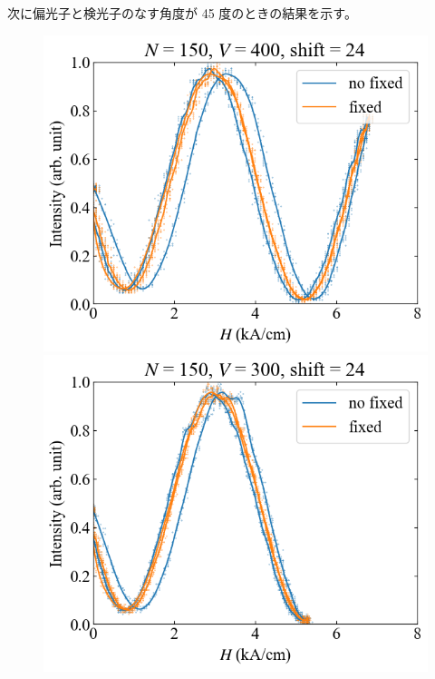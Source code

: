 \documentclass[9pt,dvipdfmx,a4paper]{jsarticle}
\begin{document}
次に偏光子と検光子のなす角度が 45 度のときの結果を示す。
\begin{figure}[H]
    \centering
    \begin{minipage}[t]{0.24\columnwidth}
        \centering
        \includegraphics[width = \columnwidth]{xy/17.png}
    \end{minipage}
    \hfill
    \begin{minipage}[t]{0.24\columnwidth}
        \centering
        \includegraphics[width = \columnwidth]{xy/18.png}
    \end{minipage}

\end{figure}
\end{document}
